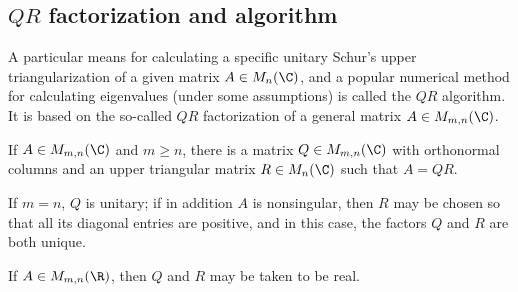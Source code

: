 \subsection{$QR$ factorization and algorithm}

A particular means for calculating a specific unitary Schur's upper triangularization of a given matrix $A\in M_n(\C)$, and a popular numerical method for calculating eigenvalues (under some
assumptions) is called the $QR$ algorithm. It is based on the so-called $QR$ factorization of a general matrix $A\in M_{m,n}(\C)$.

\begin{theorem}\label{thm:qr_factorization}
If $A \in M_{m,n}(\C)$ and $m\geq n$, there is a matrix $Q \in M_{m,n}(\C)$ with orthonormal columns and an upper triangular matrix $R\in M_{n}(\C)$ such that $A = QR$.

If $m=n$, $Q$ is unitary; if in addition $A$ is nonsingular, then $R$ may be chosen so that all its diagonal entries are positive, and in this case, the factors $Q$ and $R$ are both unique.

If $A\in M_{m,n}(\R)$, then $Q$ and $R$ may be taken to be real.
\end{theorem}


